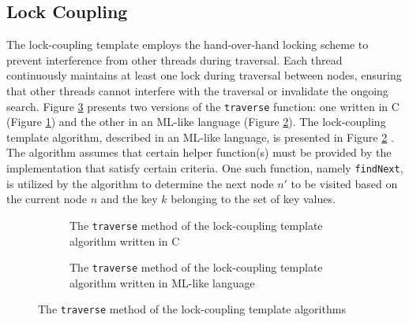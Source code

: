 \documentclass[a4paper,UKenglish,cleveref, autoref, thm-restate]{lipics-v2021}
\begin{document}
\subsection{Lock Coupling}
The lock-coupling template employs the hand-over-hand locking scheme to prevent interference from other threads during traversal. Each thread continuously maintains at least one lock during traversal between nodes, ensuring that other threads cannot interfere with the traversal or invalidate the ongoing search. Figure \ref{traverse_lock} presents two versions of the \lstinline{traverse} function: one written in C (Figure \ref{traverse_lock_a}) and the other in an ML-like language (Figure \ref{traverse_lock_b}). The lock-coupling template algorithm, described in an ML-like language, is presented in Figure \ref{traverse_lock_b} \cite{shasha_1988}.  The algorithm assumes that certain helper function(s) must be provided by the implementation that satisfy certain criteria.  One such function, namely \lstinline{findNext}, is utilized by the algorithm to determine the next node $n'$ to be visited based on the current node $n$ and the key $k$ belonging to the set of key values. 

\begin{figure}[ht]
	\begin{subfigure}[t]{0.48\textwidth}
		 
		\caption{The \lstinline{traverse} method of the lock-coupling template algorithm written in C}
		\label{traverse_lock_a}
	\end{subfigure}\qquad
	\begin{subfigure}[t]{0.45\textwidth}
		 
		\caption{The \lstinline{traverse} method of the lock-coupling template algorithm written in ML-like language}
		\label{traverse_lock_b}	
	\end{subfigure}
	\caption{The \lstinline{traverse} method of the lock-coupling template algorithms}
	\label{traverse_lock}
\end{figure}
\end{document}
